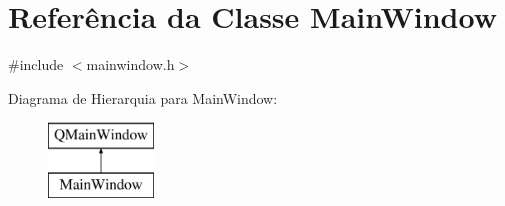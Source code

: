 \hypertarget{class_main_window}{}\section{Referência da Classe Main\+Window}
\label{class_main_window}


{\ttfamily \#include $<$mainwindow.\+h$>$}

Diagrama de Hierarquia para Main\+Window\+:\begin{figure}[H]
\begin{center}
\leavevmode
\includegraphics[height=2.000000cm]{class_main_window}
\end{center}
\end{figure}
